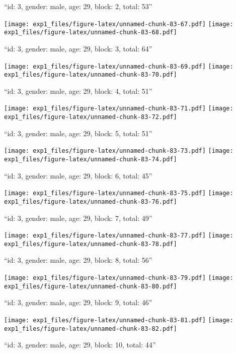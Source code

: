 \documentclass[11pt,,]{article}
\begin{document}
``id: 3, gender: male, age: 29, block: 2, total: 53''

\texttt{[image: exp1\_files/figure-latex/unnamed-chunk-83-67.pdf]}
\texttt{[image: exp1\_files/figure-latex/unnamed-chunk-83-68.pdf]}

\newpage
[1] 

``id: 3, gender: male, age: 29, block: 3, total: 64''

\texttt{[image: exp1\_files/figure-latex/unnamed-chunk-83-69.pdf]}
\texttt{[image: exp1\_files/figure-latex/unnamed-chunk-83-70.pdf]}

\newpage
[1] 

``id: 3, gender: male, age: 29, block: 4, total: 51''

\texttt{[image: exp1\_files/figure-latex/unnamed-chunk-83-71.pdf]}
\texttt{[image: exp1\_files/figure-latex/unnamed-chunk-83-72.pdf]}

\newpage
[1] 

``id: 3, gender: male, age: 29, block: 5, total: 51''

\texttt{[image: exp1\_files/figure-latex/unnamed-chunk-83-73.pdf]}
\texttt{[image: exp1\_files/figure-latex/unnamed-chunk-83-74.pdf]}

\newpage
[1] 

``id: 3, gender: male, age: 29, block: 6, total: 45''

\texttt{[image: exp1\_files/figure-latex/unnamed-chunk-83-75.pdf]}
\texttt{[image: exp1\_files/figure-latex/unnamed-chunk-83-76.pdf]}

\newpage
[1] 

``id: 3, gender: male, age: 29, block: 7, total: 49''

\texttt{[image: exp1\_files/figure-latex/unnamed-chunk-83-77.pdf]}
\texttt{[image: exp1\_files/figure-latex/unnamed-chunk-83-78.pdf]}

\newpage
[1] 

``id: 3, gender: male, age: 29, block: 8, total: 56''

\texttt{[image: exp1\_files/figure-latex/unnamed-chunk-83-79.pdf]}
\texttt{[image: exp1\_files/figure-latex/unnamed-chunk-83-80.pdf]}

\newpage
[1] 

``id: 3, gender: male, age: 29, block: 9, total: 46''

\texttt{[image: exp1\_files/figure-latex/unnamed-chunk-83-81.pdf]}
\texttt{[image: exp1\_files/figure-latex/unnamed-chunk-83-82.pdf]}

\newpage
[1] 

``id: 3, gender: male, age: 29, block: 10, total: 44''
\end{document}
